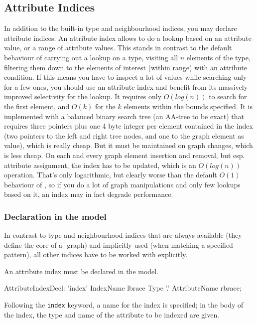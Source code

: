 \subsection{Attribute Indices}
In addition to the built-in type and neighbourhood indices, you may declare attribute indices.
An attribute index allows to do a lookup based on an attribute value, or a range of attribute values.
This stands in contrast to the default behaviour of carrying out a lookup on a type, visiting all $n$ elements of the type, filtering them down to the elements of interest (within range) with an attribute condition.
If this means you have to inspect a lot of values while searching only for a few ones, you should use an attribute index and benefit from its massively improved selectivity for the lookup.
It requires only $O(log(n))$ to search for the first element, and $O(k)$ for the $k$ elements within the bounds specified.
It is implemented with a balanced binary search tree (an AA-tree\cite{Andersson93balancedsearch} to be exact) that requires three pointers plus one 4 byte integer per element contained in the index (two pointers to the left and right tree nodes, and one to the graph element as value), which is really cheap.
But it must be maintained on graph changes, which is less cheap.
On each and every graph element insertion and removal, but esp. attribute assignment, the index has to be updated, which is an $O(log(n))$ operation.
That's only logarithmic, but clearly worse than the default $O(1)$ behaviour of \GrG{}, so if you do a lot of graph manipulations and only few lookups based on it, an index may in fact degrade performance.

\subsubsection*{Declaration in the model}
In contrast to type and neighbourhood indices that are always available (they define the core of a \GrG{}-graph) and implicitly used (when matching a specified pattern), all other indices have to be worked with explicitly.

An attribute index must be declared in the model.

\begin{rail}
  AttributeIndexDecl: 'index' IndexName lbrace Type '.' AttributeName rbrace;
\end{rail}

Following the \texttt{index} keyword, a name for the index is specified; in the body of the index, the type and name of the attribute to be indexed are given.

